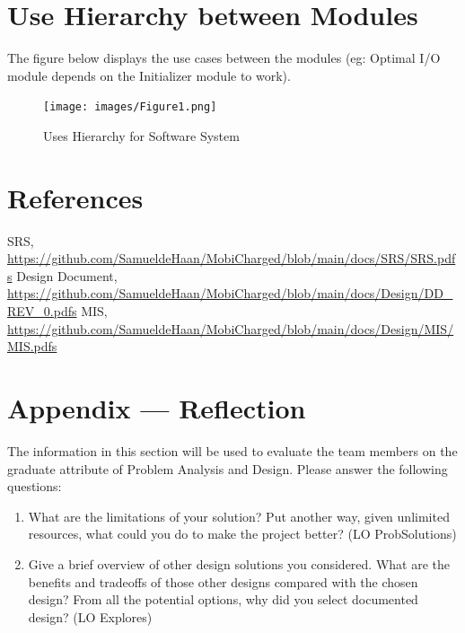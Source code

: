 \documentclass[12pt, titlepage]{article}
\begin{document}
\section{Use Hierarchy between Modules}
The figure below displays the use cases between the modules (eg: Optimal I/O module depends on the Initializer module to work).
\begin{figure}[htp]
  \centering
  \texttt{[image: images/Figure1.png]}
  \caption[Uses Hierarchy]{Uses Hierarchy for Software System}
  \label{fig:figure3}
\end{figure}


\section*{References}
SRS, \url{https://github.com/SamueldeHaan/MobiCharged/blob/main/docs/SRS/SRS.pdfs}
Design Document, \url{https://github.com/SamueldeHaan/MobiCharged/blob/main/docs/Design/DD_REV_0.pdfs}
MIS, \url{https://github.com/SamueldeHaan/MobiCharged/blob/main/docs/Design/MIS/MIS.pdfs}





\newpage

\newpage{}
\section*{Appendix --- Reflection}

The information in this section will be used to evaluate the team members on the graduate attribute of Problem Analysis and Design. Please answer the following questions: 
\par 
\begin{enumerate}
  \item What are the limitations of your solution? Put another way, given unlimited resources, what could you do to make the project better? (LO ProbSolutions) 
  \item Give a brief overview of other design solutions you considered. What are the benefits and tradeoffs of those other designs compared with the chosen design? From all the potential options, why did you select documented design? (LO Explores)
\end{enumerate}
\end{document}
